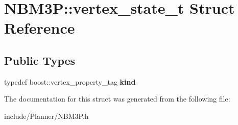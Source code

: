 \hypertarget{struct_n_b_m3_p_1_1vertex__state__t}{\section{N\-B\-M3\-P\-:\-:vertex\-\_\-state\-\_\-t Struct Reference}
\label{struct_n_b_m3_p_1_1vertex__state__t}
}
\subsection*{Public Types}
\begin{DoxyCompactItemize}
\item 
\hypertarget{struct_n_b_m3_p_1_1vertex__state__t_a7b393a3c47ca13c7e5876d9392b8e2fc}{typedef boost\-::vertex\-\_\-property\-\_\-tag {\bfseries kind}}\label{struct_n_b_m3_p_1_1vertex__state__t_a7b393a3c47ca13c7e5876d9392b8e2fc}

\end{DoxyCompactItemize}


The documentation for this struct was generated from the following file\-:\begin{DoxyCompactItemize}
\item 
include/\-Planner/N\-B\-M3\-P.\-h\end{DoxyCompactItemize}
